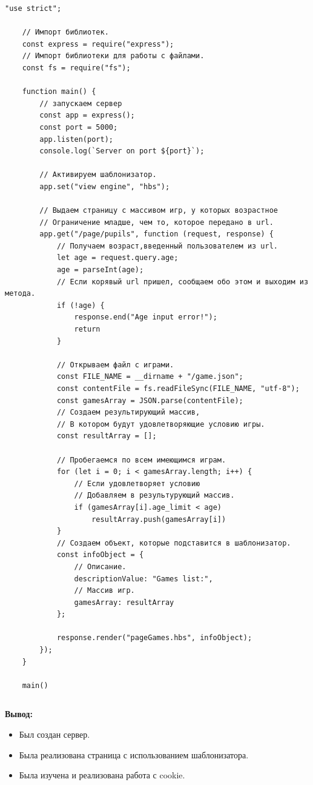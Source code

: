 \begin{lstlisting}[caption=Код программы. TASK\_2. Реализация задания 1]
	"use strict";

	// Импорт библиотек.
	const express = require("express");
	// Импорт библиотеки для работы с файлами.
	const fs = require("fs");

	function main() {
		// запускаем сервер
		const app = express();
		const port = 5000;
		app.listen(port);
		console.log(`Server on port ${port}`);
	
		// Активируем шаблонизатор.
		app.set("view engine", "hbs");
	
		// Выдаем страницу с массивом игр, у которых возрастное
		// Ограничение младше, чем то, которое передано в url.
		app.get("/page/pupils", function (request, response) {
			// Получаем возраст,введенный пользователем из url.
			let age = request.query.age;
			age = parseInt(age);
			// Если корявый url пришел, сообщаем обо этом и выходим из метода.
			if (!age) {
				response.end("Age input error!");
				return
			}
	
			// Открываем файл с играми.
			const FILE_NAME = __dirname + "/game.json";
			const contentFile = fs.readFileSync(FILE_NAME, "utf-8");
			const gamesArray = JSON.parse(contentFile);
			// Создаем результирующий массив,
			// В котором будут удовлетворяющие условию игры. 
			const resultArray = [];
	
			// Пробегаемся по всем имеющимся играм.
			for (let i = 0; i < gamesArray.length; i++) {
				// Если удовлетворяет условию 
				// Добавляем в результурующий массив.
				if (gamesArray[i].age_limit < age)
					resultArray.push(gamesArray[i])
			}
			// Создаем объект, которые подставится в шаблонизатор.
			const infoObject = {
				// Описание.
				descriptionValue: "Games list:",
				// Массив игр.
				gamesArray: resultArray
			};
	
			response.render("pageGames.hbs", infoObject);
		});
	}
	
	main()
\end{lstlisting}


\begin{lstlisting}[caption=Код программы. TASK\_2. Реализация задания 2]

\end{lstlisting}

\textbf{Вывод:}

\begin{itemize} 
	\item Был создан сервер.
	\item Была реализована страница с использованием шаблонизатора.
	\item Была изучена и реализована работа с cookie.
\end{itemize}


